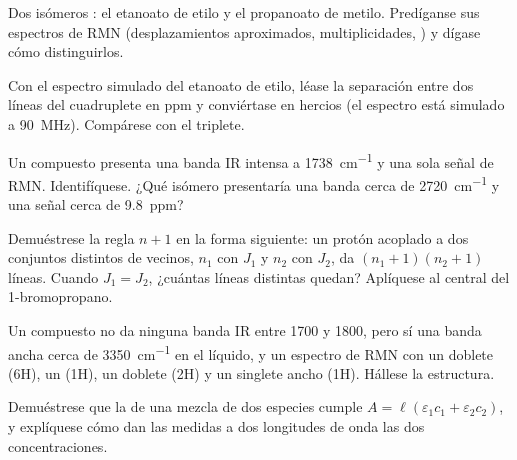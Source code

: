 \begin{exercise}[$\star\star$]\label{exo:b1:structure-spectroscopy:7}
Dos isómeros : el etanoato de etilo y el propanoato de metilo.
Predíganse sus espectros de RMN (desplazamientos aproximados,
multiplicidades, ) y dígase cómo distinguirlos.
\end{exercise}

\begin{exercise}[$\star\star$]\label{exo:b1:structure-spectroscopy:8}
Con el espectro simulado del etanoato de etilo, léase la separación entre
dos líneas del cuadruplete en ppm y conviértase en hercios (el espectro
está simulado a \qty{90}{MHz}). Compárese con el triplete.
\end{exercise}

\begin{exercise}[$\star\star$]\label{exo:b1:structure-spectroscopy:9}
Un compuesto  presenta una banda IR intensa a
\qty{1738}{cm^{-1}} y una sola señal de RMN. Identifíquese. ¿Qué isómero
presentaría una banda cerca de \qty{2720}{cm^{-1}} y una señal cerca de
\qty{9.8}{ppm}?
\end{exercise}

\begin{exercise}[$\star\star\star$]\label{exo:b1:structure-spectroscopy:10}
Demuéstrese la regla $n + 1$ en la forma siguiente: un protón acoplado a
dos conjuntos distintos de vecinos, $n_1$ con $J_1$ y $n_2$ con $J_2$, da
$(n_1 +
1)(n_2 + 1)$ líneas. Cuando $J_1 = J_2$, ¿cuántas líneas distintas
quedan? Aplíquese al  central del 1-bromopropano.
\end{exercise}

\begin{exercise}[$\star\star\star$]\label{exo:b1:structure-spectroscopy:11}
Un compuesto  no da ninguna banda IR entre 1700 y 1800, pero
sí una banda ancha cerca de \qty{3350}{cm^{-1}} en el líquido, y un
espectro de RMN con un doblete (6H), un  (1H), un doblete (2H)
y un singlete ancho (1H). Hállese la estructura.
\end{exercise}

\begin{exercise}[$\star\star\star$]\label{exo:b1:structure-spectroscopy:12}
Demuéstrese que la  de una mezcla de dos especies cumple
$A = \ell(\varepsilon_1c_1
+ \varepsilon_2c_2)$, y explíquese cómo dan las medidas a dos longitudes
de onda las dos concentraciones.
\end{exercise}

